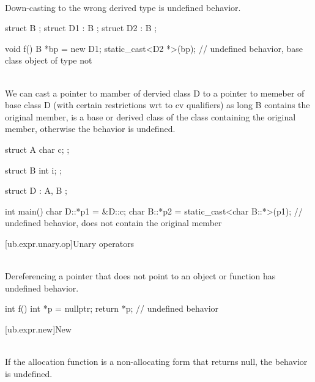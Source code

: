 {\pnum
{} \\
Down-casting to the wrong derived type is undefined behavior.

\pnum
\begin{example}
\begin{codeblock}
struct B {};
struct D1 : B {};
struct D2 : B {};

void f() {
  B *bp = new D1;
  static_cast<D2 *>(bp);        // undefined behavior, base class object of type  not 
}
\end{codeblock}
\end{example}

\pnum
{} \\
We can cast a pointer to mamber of dervied class D to a pointer to memeber of base class D (with certain restrictions wrt to cv qualifiers)
as long B contains the original member, is a base or derived class of the class containing the original member, otherwise the behavior is undefined.


\pnum
\begin{example}
\begin{codeblock}
struct A {
  char c;
};

struct B {
  int i;
};

struct D : A, B {};

int main() {
  char D::*p1 = &D::c;
  char B::*p2 = static_cast<char B::*>(p1); // undefined behavior,  does not contain the original member 
}
\end{codeblock}
\end{example}

[ub.expr.unary.op]{Unary operators}

\pnum
{} \\
Dereferencing a pointer that does not point to an object or function
has undefined behavior.

\pnum
\begin{example}
\begin{codeblock}
int f()
{
  int *p = nullptr;
  return *p;    // undefined behavior
}
\end{codeblock}
\end{example}


[ub.expr.new]{New}

\pnum
{} \\
If the allocation
function is a non-allocating form  that returns null, the behavior is undefined.

}
